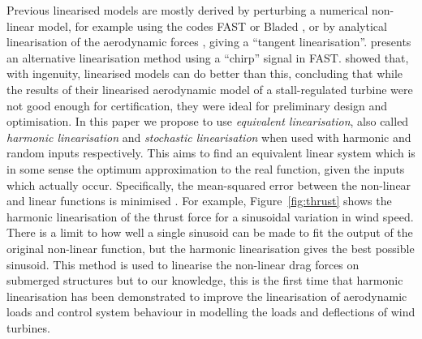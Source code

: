 \documentclass[a4paper,preprint]{elsarticle}
\begin{document}
Previous linearised models are mostly derived by perturbing a numerical
non-linear model, for example using the codes FAST \citep{jonkman_fast_2016} or
Bladed \citep{GarradHassan2011}, or by analytical linearisation of the
aerodynamic forces \citep{Lee2005}, giving a ``tangent linearisation''.
\citet{olondriz_alternative_2018} presents an alternative linearisation method
using a ``chirp'' signal in FAST. \citet{merz_simple_2012} showed that, with
ingenuity, linearised models can do better than this, concluding that while the
results of their linearised aerodynamic model of a stall-regulated turbine were
not good enough for certification, they were ideal for preliminary design and
optimisation. In this paper we propose to use \emph{equivalent linearisation},
also called \emph{harmonic linearisation} and \emph{stochastic linearisation}
when used with harmonic and random inputs respectively. This aims to find an
equivalent linear system which is in some sense the optimum approximation to the
real function, given the inputs which actually occur. Specifically, the
mean-squared error between the non-linear and linear functions is minimised
\citep{Vidyasagar1993}. For example, Figure~\ref{fig:thrust} shows the harmonic
linearisation of the thrust force for a sinusoidal variation in wind speed.
There is a limit to how well a single sinusoid can be made to fit the output of
the original non-linear function, but the harmonic linearisation gives the best
possible sinusoid. This method is used to linearise the non-linear drag forces
on submerged structures \citep{Langley1984} but to our knowledge, this is the
first time that harmonic linearisation has been demonstrated to improve the
linearisation of aerodynamic loads and control system behaviour in modelling the
loads and deflections of wind turbines.
\end{document}
